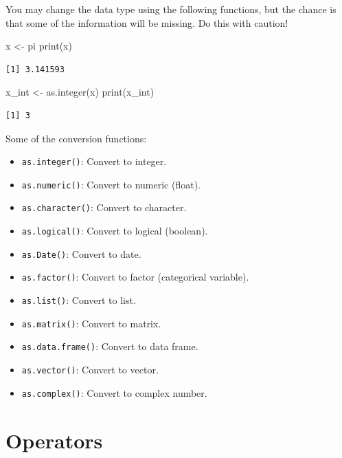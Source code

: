 \documentclass[
  letterpaper,
  DIV=11,
  numbers=noendperiod]{scrreprt}
\newenvironment{Shaded}{\begin{snugshade}}{\end{snugshade}}
\newcommand{\FunctionTok}[1]{\textcolor[rgb]{0.28,0.35,0.67}{#1}}
\newcommand{\NormalTok}[1]{\textcolor[rgb]{0.00,0.23,0.31}{#1}}
\newcommand{\OtherTok}[1]{\textcolor[rgb]{0.00,0.23,0.31}{#1}}
\providecommand{\tightlist}{%
  \setlength{\itemsep}{0pt}\setlength{\parskip}{0pt}}
\begin{document}
You may change the data type using the following functions, but the
chance is that some of the information will be missing. Do this with
caution!

\begin{Shaded}
\begin{Highlighting}[]
\NormalTok{x }\OtherTok{\textless{}{-}}\NormalTok{ pi}
\FunctionTok{print}\NormalTok{(x)}
\end{Highlighting}
\end{Shaded}

\begin{verbatim}
[1] 3.141593
\end{verbatim}

\begin{Shaded}
\begin{Highlighting}[]
\NormalTok{x\_int }\OtherTok{\textless{}{-}} \FunctionTok{as.integer}\NormalTok{(x)}
\FunctionTok{print}\NormalTok{(x\_int)}
\end{Highlighting}
\end{Shaded}

\begin{verbatim}
[1] 3
\end{verbatim}

Some of the conversion functions:

\begin{itemize}
\tightlist
\item
  \texttt{as.integer()}: Convert to integer.
\item
  \texttt{as.numeric()}: Convert to numeric (float).
\item
  \texttt{as.character()}: Convert to character.
\item
  \texttt{as.logical()}: Convert to logical (boolean).
\item
  \texttt{as.Date()}: Convert to date.
\item
  \texttt{as.factor()}: Convert to factor (categorical variable).
\item
  \texttt{as.list()}: Convert to list.
\item
  \texttt{as.matrix()}: Convert to matrix.
\item
  \texttt{as.data.frame()}: Convert to data frame.
\item
  \texttt{as.vector()}: Convert to vector.
\item
  \texttt{as.complex()}: Convert to complex number.
\end{itemize}

\section{Operators}\label{operators}
\end{document}
